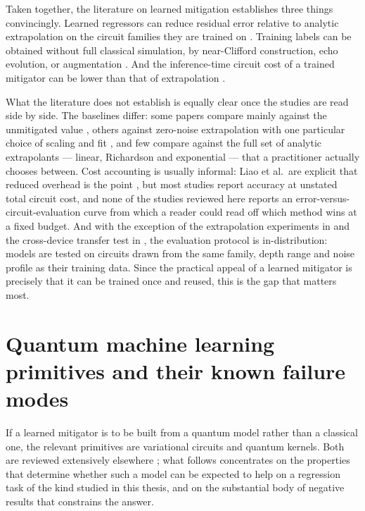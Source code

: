 \documentclass[Thesis.tex]{subfiles}
\begin{document}
Taken together, the literature on learned mitigation establishes three things
convincingly. Learned regressors can reduce residual error relative to
analytic extrapolation on the circuit families they are trained on
\cite{czarnik2021clifford,lowe2021unified,liao2024machine}. Training labels can
be obtained without full classical simulation, by near-Clifford construction,
echo evolution, or augmentation
\cite{czarnik2021clifford,babukhin2024echo,liao2025noiseagnostic}. And the
inference-time circuit cost of a trained mitigator can be lower than that of
extrapolation \cite{liao2024machine}.

What the literature does not establish is equally clear once the studies are
read side by side. The baselines differ: some papers compare mainly against the
unmitigated value \cite{bennewitz2022neural,zhukov2024quantum}, others against
zero-noise extrapolation with one particular choice of scaling and fit
\cite{lowe2021unified,liao2024machine}, and few compare against the full set of
analytic extrapolants --- linear, Richardson and exponential --- that a
practitioner actually chooses between. Cost accounting is usually informal:
Liao et al.\ are explicit that reduced overhead is the point
\cite{liao2024machine}, but most studies report accuracy at unstated total
circuit cost, and none of the studies reviewed here reports an
error-versus-circuit-evaluation curve from which a reader could read off which
method wins at a fixed budget. And with the exception of the extrapolation
experiments in \cite{liao2024machine} and the cross-device transfer test in
\cite{zlokapa2020deep}, the evaluation protocol is in-distribution: models are
tested on circuits drawn from the same family, depth range and noise profile as
their training data. Since the practical appeal of a learned mitigator is
precisely that it can be trained once and reused, this is the gap that matters
most.

\section{Quantum machine learning primitives and their known failure modes}\label{sec2:qml}

If a learned mitigator is to be built from a quantum model rather than a
classical one, the relevant primitives are variational circuits and quantum
kernels. Both are reviewed extensively elsewhere \cite{cerezo2021vqa}; what
follows concentrates on the properties that determine whether such a model can
be expected to help on a regression task of the kind studied in this thesis,
and on the substantial body of negative results that constrains the answer.
\end{document}
